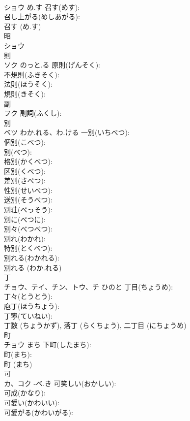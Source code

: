 \documentclass[8pt]{extreport}
\begin{document}
\begin{CJK}{UTF8}{min}
\\	ショウ	め.す	召す(めす): 
\\	召し上がる(めしあがる): 
\\	召す (め.す)
\\	昭			
\\	ショウ			
\\	則			
\\	ソク	のっと.る	原則(げんそく): 
\\	不規則(ふきそく): 
\\	法則(ほうそく): 
\\	規則(きそく): 
\\	副			
\\	フク		副詞(ふくし): 
\\	別			
\\	ベツ	わか.れる、わ.ける	一別(いちべつ): 
\\	個別(こべつ): 
\\	別(べつ): 
\\	格別(かくべつ): 
\\	区別(くべつ): 
\\	差別(さべつ): 
\\	性別(せいべつ): 
\\	送別(そうべつ): 
\\	別荘(べっそう): 
\\	別に(べつに): 
\\	別々(べつべつ): 
\\	別れ(わかれ): 
\\	特別(とくべつ): 
\\	別れる(わかれる): 
\\	別れる (わか.れる)
\\	丁			
\\	チョウ、テイ、チン、トウ、チ	ひのと	丁目(ちょうめ): 
\\	丁々(とうとう): 
\\	庖丁(ほうちょう): 
\\	丁寧(ていねい): 
\\	丁数 (ちょうかず), 落丁 (らくちょう), 二丁目 (にちょうめ)
\\	町			
\\	チョウ	まち	下町(したまち): 
\\	町(まち): 
\\	町 (まち)
\\	可			
\\	カ、コク	-べ.き	可笑しい(おかしい): 
\\	可成(かなり): 
\\	可愛い(かわいい): 
\\	可愛がる(かわいがる): 

\end{CJK}
\end{document}
